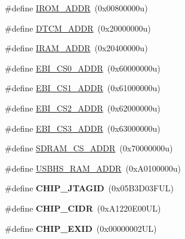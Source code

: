 \begin{DoxyCompactItemize}
\item 
\#define \mbox{\hyperlink{group__SAMV71Q21__definitions_ga694212ffb8c2786bacee3d0ad6020bda}{I\+R\+O\+M\+\_\+\+A\+D\+DR}}~(0x00800000u)
\item 
\#define \mbox{\hyperlink{group__SAMV71Q21__definitions_ga26626a425f7ebb3a0c2dbc276f0d9f78}{D\+T\+C\+M\+\_\+\+A\+D\+DR}}~(0x20000000u)
\item 
\#define \mbox{\hyperlink{group__SAMV71Q21__definitions_gaae45ac2ef16942159481c767ac4805cf}{I\+R\+A\+M\+\_\+\+A\+D\+DR}}~(0x20400000u)
\item 
\#define \mbox{\hyperlink{group__SAMV71Q21__definitions_ga9bcbb97ddae3b2cc5e2c9613d33f66b4}{E\+B\+I\+\_\+\+C\+S0\+\_\+\+A\+D\+DR}}~(0x60000000u)
\item 
\#define \mbox{\hyperlink{group__SAMV71Q21__definitions_gaaddd9fdbbc77c9aced5308819f502a26}{E\+B\+I\+\_\+\+C\+S1\+\_\+\+A\+D\+DR}}~(0x61000000u)
\item 
\#define \mbox{\hyperlink{group__SAMV71Q21__definitions_ga058a35f9991487dc2dd12ada792d0730}{E\+B\+I\+\_\+\+C\+S2\+\_\+\+A\+D\+DR}}~(0x62000000u)
\item 
\#define \mbox{\hyperlink{group__SAMV71Q21__definitions_gad66ebdd0fc33ec3cf85dbaa14bbf05d9}{E\+B\+I\+\_\+\+C\+S3\+\_\+\+A\+D\+DR}}~(0x63000000u)
\item 
\#define \mbox{\hyperlink{group__SAMV71Q21__definitions_ga61b7db25daf759c2a2beb6e5a0b57a84}{S\+D\+R\+A\+M\+\_\+\+C\+S\+\_\+\+A\+D\+DR}}~(0x70000000u)
\item 
\#define \mbox{\hyperlink{group__SAMV71Q21__definitions_ga509eeb3745bd4057d342dd132dd2cecf}{U\+S\+B\+H\+S\+\_\+\+R\+A\+M\+\_\+\+A\+D\+DR}}~(0x\+A0100000u)
\item 
\mbox{\label{group__SAMV71Q21__definitions_gaa614519778eec0df55d3eeab3223e3f6}} 
\#define {\bfseries C\+H\+I\+P\+\_\+\+J\+T\+A\+G\+ID}~(0x05\+B3\+D03\+F\+U\+L)
\item 
\mbox{\label{group__SAMV71Q21__definitions_ga1e1ae44dd9269a8a98c1d7e7a60e9fbd}} 
\#define {\bfseries C\+H\+I\+P\+\_\+\+C\+I\+DR}~(0x\+A1220\+E00\+U\+L)
\item 
\mbox{\label{group__SAMV71Q21__definitions_ga35123717aa86b76bb6b73cf3adc4c2e6}} 
\#define {\bfseries C\+H\+I\+P\+\_\+\+E\+X\+ID}~(0x00000002\+U\+L)
\item 
\mbox{\label{group__SAMV71Q21__definitions_ga0e868bf27426399dfdcb3a9dfc3733c4}} 

\end{DoxyCompactItemize}
